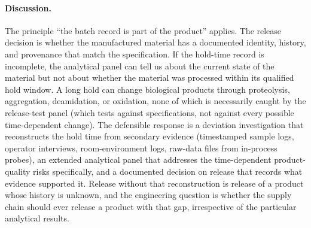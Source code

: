\paragraph{Discussion.}
The principle ``the batch record is part of the product'' applies.
The release decision is whether the manufactured material has a
documented identity, history, and provenance that match the
specification. If the hold-time record is incomplete, the analytical
panel can tell us about the current state of the material but not
about whether the material was processed within its qualified hold
window. A long hold can change biological products through
proteolysis, aggregation, deamidation, or oxidation, none of which is
necessarily caught by the release-test panel (which tests against
specifications, not against every possible time-dependent change). The
defensible response is a deviation investigation that reconstructs
the hold time from secondary evidence (timestamped sample logs,
operator interviews, room-environment logs, raw-data files from
in-process probes), an extended analytical panel that addresses the
time-dependent product-quality risks specifically, and a documented
decision on release that records what evidence supported it. Release
without that reconstruction is release of a product whose history is
unknown, and the engineering question is whether the supply chain
should ever release a product with that gap, irrespective of the
particular analytical results.
